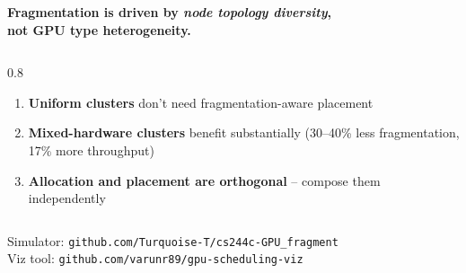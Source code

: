 \documentclass[aspectratio=169,pdf]{beamer}
\begin{document}
\begin{frame}{}

\vfill

\begin{center}

{\Large \textbf{Fragmentation is driven by \textit{node topology diversity},\\[6pt] not GPU type heterogeneity.}}

\vspace{24pt}

\begin{columns}[T]
\begin{column}{0.8\textwidth}
\begin{enumerate}
  \item \textbf{Uniform clusters} don't need fragmentation-aware placement
  \item \textbf{Mixed-hardware clusters} benefit substantially (30--40\% less fragmentation, 17\% more throughput)
  \item \textbf{Allocation and placement are orthogonal} -- compose them independently
\end{enumerate}
\end{column}
\end{columns}

\vspace{18pt}

\small
Simulator: \texttt{github.com/Turquoise-T/cs244c-GPU\_fragment}\\
Viz tool: \texttt{github.com/varunr89/gpu-scheduling-viz}

\end{center}

\vfill


\end{frame}
\end{document}
